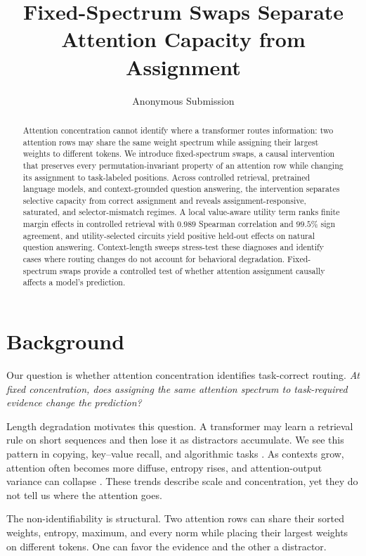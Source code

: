 \documentclass[letterpaper]{article} %
\title{Fixed-Spectrum Swaps Separate Attention Capacity from Assignment}
\author{Anonymous Submission}
\begin{document}
\setcounter{secnumdepth}{2}
\maketitle

\begin{abstract}
Attention concentration cannot identify where a transformer routes information: two attention rows may share
the same weight spectrum while assigning their largest weights to different tokens. We introduce
fixed-spectrum swaps, a causal intervention that preserves every permutation-invariant property of an attention
row while changing its assignment to task-labeled positions. Across controlled retrieval, pretrained language
models, and context-grounded question answering, the intervention separates selective capacity from correct
assignment and reveals assignment-responsive, saturated, and selector-mismatch regimes. A local value-aware
utility term ranks finite margin effects in controlled retrieval with $0.989$ Spearman correlation and $99.5\%$
sign agreement, and utility-selected circuits yield positive held-out effects on natural question answering.
Context-length sweeps stress-test these diagnoses and identify cases where routing changes do not account for
behavioral degradation. Fixed-spectrum swaps provide a controlled test of whether attention assignment causally
affects a model's prediction.
\end{abstract}

\section{Background}

Our question is whether attention concentration identifies task-correct routing. \emph{At fixed concentration,
does assigning the same attention spectrum to task-required evidence change the prediction?}

Length degradation motivates this question. A transformer may learn a retrieval rule on short sequences and
then lose it as distractors accumulate. We see this pattern in copying, key--value recall, and algorithmic tasks
\citep{kazemnejad,nopeentropy,sparselong}. As contexts grow, attention often becomes more diffuse, entropy rises,
and attention-output variance can collapse \citep{vanishingvariance}. These trends describe scale and
concentration, yet they do not tell us where the attention goes.

The non-identifiability is structural. Two attention rows can share their sorted weights, entropy, maximum, and
every norm while placing their largest weights on different tokens. One can favor the evidence and the other a
distractor.
\end{document}
